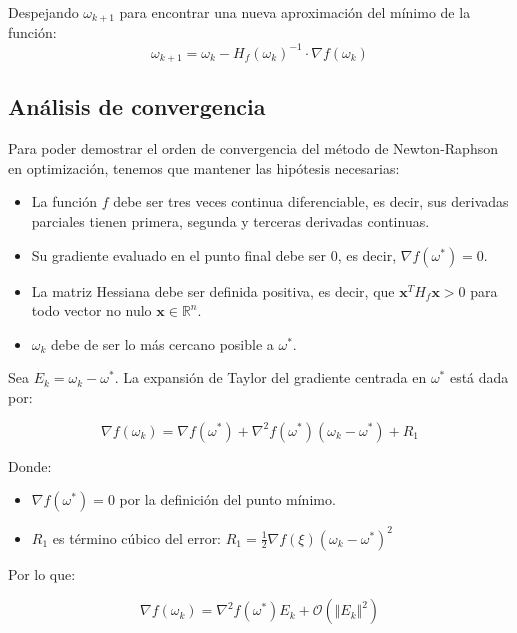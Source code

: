 \documentclass[conference]{IEEEtran}
\begin{document}
Despejando \( \omega_{k+1} \) para encontrar una nueva aproximación del mínimo de la función:
\begin{equation}
\omega_{k+1}=\omega_k-H_f(\omega_k)^{-1}\cdot\nabla f(\omega_k)
\label{eq:newton_actualizacion}
\end{equation}

\subsection{Análisis de convergencia}
Para poder demostrar el orden de convergencia del método de Newton-Raphson en optimización, tenemos que mantener las hipótesis necesarias:
\begin{itemize}
  \item La función $f$ debe ser tres veces continua diferenciable, es decir, sus derivadas parciales tienen primera, segunda y terceras derivadas continuas.
  \item Su gradiente evaluado en el punto final debe ser $0$, es decir, $\nabla f(\omega^{*})=0$.
  \item La matriz Hessiana debe ser definida positiva, es decir, que $\mathbf{x}^{T}H_{f}\mathbf{x}>0$ para todo vector no nulo $\mathbf{x}\in \mathbb{R}^{n}$.
  \item $\omega_{k}$ debe de ser lo más cercano posible a $\omega^{*}$.
\end{itemize}

Sea $E_{k}=\omega_{k}-\omega^{*}$. La expansión de Taylor del gradiente centrada en $\omega^{*}$ está dada por:

\begin{equation}
\nabla f(\omega_{k})=\nabla f(\omega^{*})+\nabla^{2}f(\omega^{*})(\omega_{k}-\omega^{*})+R_{1}
\end{equation}

Donde:
\begin{itemize}
  \item $\nabla f(\omega^{*})=0$ por la definición del punto mínimo.
  \item $R_{1}$ es término cúbico del error: $R_{1}=\frac{1}{2}\nabla f(\xi)(\omega_{k}-\omega^{*})^{2}$
\end{itemize}

Por lo que:

\begin{equation} \label{taylor_polinomial}
\nabla f(\omega_{k})=\nabla^{2}f(\omega^{*})E_{k}+\mathcal{O}(\Vert E_{k}\Vert ^{2})
\end{equation}
\end{document}
